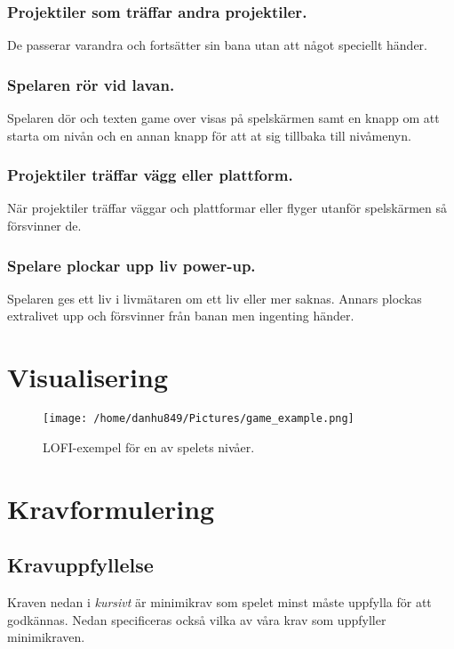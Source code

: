 \documentclass{TDP005mall}
\begin{document}
\subsubsection{Projektiler som träffar andra projektiler.}
De passerar varandra och fortsätter sin bana utan att något speciellt händer.


\subsubsection{Spelaren rör vid lavan.}
Spelaren dör och texten game over visas på spelskärmen samt en knapp om att starta om nivån och en annan knapp för att at sig tillbaka till nivåmenyn.

\subsubsection{Projektiler träffar vägg eller plattform.}
När projektiler träffar väggar och plattformar eller flyger utanför spelskärmen så försvinner de.

\subsubsection{Spelare plockar upp liv power-up.}
Spelaren ges ett liv i livmätaren om ett liv eller mer saknas. Annars plockas extralivet upp och försvinner från banan men ingenting händer.

\newpage
\section{Visualisering}%

\begin{figure}[h!]
  \centerline{\texttt{[image: /home/danhu849/Pictures/game\_example.png]}}
  \caption{LOFI-exempel för en av spelets nivåer.\label{fig}}
\end{figure}

\section{Kravformulering}
\subsection{Kravuppfyllelse}
Kraven nedan i \emph{kursivt} är minimikrav som spelet minst måste uppfylla för att godkännas. Nedan specificeras också vilka av våra krav som uppfyller minimikraven.
\end{document}
